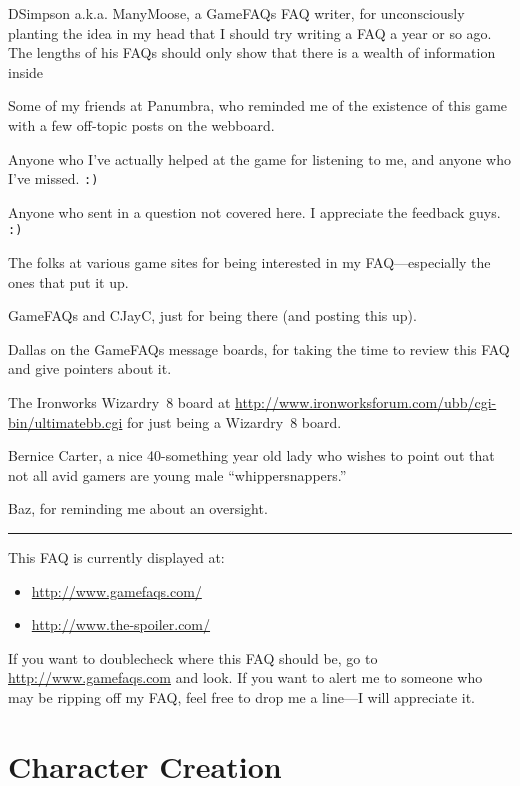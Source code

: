 \documentclass[12pt]{article}
\providecommand{\tightlist}{%
  \setlength{\itemsep}{0pt}\setlength{\parskip}{0pt}}
\begin{document}
DSimpson a.k.a. ManyMoose, a GameFAQs FAQ writer, for unconsciously
planting the idea in my head that I should try writing a FAQ a year or
so ago. The lengths of his FAQs should only show that there is a wealth
of information inside

Some of my friends at Panumbra, who reminded me of the existence of this
game with a few off-topic posts on the webboard.

Anyone who I've actually helped at the game for listening to me, and
anyone who I've missed. \texttt{:)}

Anyone who sent in a question not covered here. I appreciate the
feedback guys. \texttt{:)}

The folks at various game sites for being interested in my
FAQ---especially the ones that put it up.

GameFAQs and CJayC, just for being there (and posting this up).

Dallas on the GameFAQs message boards, for taking the time to review
this FAQ and give pointers about it.

The Ironworks Wizardry~8 board at
\url{http://www.ironworksforum.com/ubb/cgi-bin/ultimatebb.cgi} for just
being a Wizardry~8 board.

Bernice Carter, a nice 40-something year old lady who wishes to point
out that not all avid gamers are young male ``whippersnappers.''

Baz, for reminding me about an oversight.

\begin{center}\rule{0.5\linewidth}{\linethickness}\end{center}

This FAQ is currently displayed at:

\begin{itemize}
\tightlist
\item
  \url{http://www.gamefaqs.com/}
\item
  \url{http://www.the-spoiler.com/}
\end{itemize}

If you want to doublecheck where this FAQ should be, go to
\url{http://www.gamefaqs.com} and look. If you want to alert me to
someone who may be ripping off my FAQ, feel free to drop me a line---I
will appreciate it.

\section{Character Creation}\label{character-creation}
\end{document}
